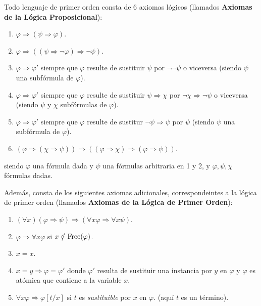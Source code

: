 \documentclass[12pt]{report}
\theoremstyle{largebreak}
\newcommand{\free}{\textup{Free}}
\begin{document}
    \begin{mydef}
        Todo lenguaje de primer orden consta de 6 axiomas lógicos (llamados \textbf{Axiomas de la Lógica Proposicional}):
        \renewcommand{\theenumi}{\arabic{enumi}}
        \begin{enumerate}
            \item $\varphi\Rightarrow(\psi\Rightarrow\varphi)$.
            \item $\varphi\Rightarrow((\psi\Rightarrow\neg\varphi)\Rightarrow\neg\psi)$.
            \item $\varphi\Rightarrow\varphi'$ siempre que $\varphi$ resulte de sustituir $\psi$ por $\neg\neg\psi$ o viceversa (siendo $\psi$ una subfórmula de $\varphi$).
            \item $\varphi\Rightarrow\varphi'$ siempre que $\varphi$ resulte de sustituir $\psi\Rightarrow\chi$ por $\neg\chi\Rightarrow\neg\psi$ o viceversa (siendo $\psi$ y $\chi$ subfórmulas de $\varphi$).
            \item $\varphi\Rightarrow\varphi'$ siempre que $\varphi$ resulte de sustitur $\neg\psi\Rightarrow\psi$ por $\psi$ (siendo $\psi$ una subfórmula de $\varphi$).
            \item $(\varphi\Rightarrow(\chi\Rightarrow\psi))\Rightarrow((\varphi\Rightarrow\chi)\Rightarrow(\varphi\Rightarrow\psi))$.
        \end{enumerate}
        siendo $\varphi$ una fórmula dada y $\psi$ una fórmulas arbitraria en 1 y 2, y $\varphi,\psi,\chi$ fórmulas dadas.

        Además, consta de los siguientes axiomas adicionales, correspondeintes a la lógica de primer orden (llamados \textbf{Axiomas de la Lógica de Primer Orden}):
        \begin{enumerate}
            \item $(\forall x)(\varphi\Rightarrow\psi)\Rightarrow(\forall x\varphi\Rightarrow\forall x\psi)$.
            \item $\varphi\Rightarrow\forall x\varphi$ si $x\notin\free(\varphi)$.
            \item $x=x$.
            \item $x=y\Rightarrow \varphi=\varphi'$ donde $\varphi'$ resulta de sustituir una instancia por $y$ en $\varphi$ y $\varphi$ es atómica que contiene a la variable $x$.
            \item $\forall x\varphi\Rightarrow\varphi[t/x]$ si $t$ es \textit{sustituible} por $x$ en $\varphi$. (aquí $t$ es un término).
        \end{enumerate}
    \end{mydef}
\end{document}
